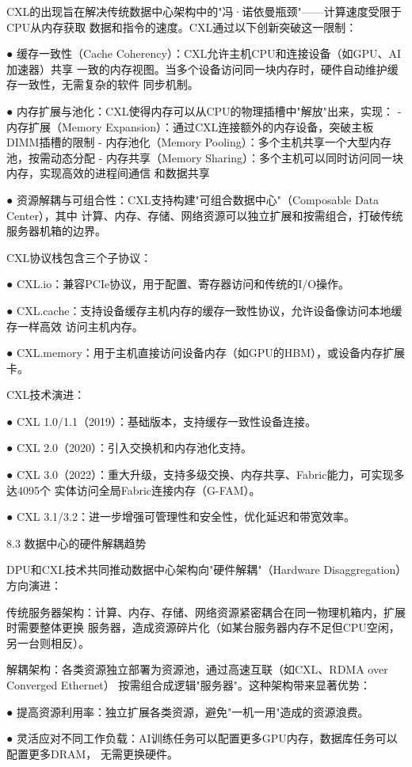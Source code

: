 CXL的出现旨在解决传统数据中心架构中的"冯·诺依曼瓶颈"——计算速度受限于CPU从内存获取
数据和指令的速度。CXL通过以下创新突破这一限制：

● 缓存一致性（Cache Coherency）：CXL允许主机CPU和连接设备（如GPU、AI加速器）共享
  一致的内存视图。当多个设备访问同一块内存时，硬件自动维护缓存一致性，无需复杂的软件
  同步机制。
  
● 内存扩展与池化：CXL使得内存可以从CPU的物理插槽中"解放"出来，实现：
  - 内存扩展（Memory Expansion）：通过CXL连接额外的内存设备，突破主板DIMM插槽的限制
  - 内存池化（Memory Pooling）：多个主机共享一个大型内存池，按需动态分配
  - 内存共享（Memory Sharing）：多个主机可以同时访问同一块内存，实现高效的进程间通信
    和数据共享

● 资源解耦与可组合性：CXL支持构建"可组合数据中心"（Composable Data Center），其中
  计算、内存、存储、网络资源可以独立扩展和按需组合，打破传统服务器机箱的边界。

CXL协议栈包含三个子协议：

● CXL.io：兼容PCIe协议，用于配置、寄存器访问和传统的I/O操作。
  
● CXL.cache：支持设备缓存主机内存的缓存一致性协议，允许设备像访问本地缓存一样高效
  访问主机内存。
  
● CXL.memory：用于主机直接访问设备内存（如GPU的HBM），或设备内存扩展卡。

CXL技术演进：

● CXL 1.0/1.1（2019）：基础版本，支持缓存一致性设备连接。
  
● CXL 2.0（2020）：引入交换机和内存池化支持。
  
● CXL 3.0（2022）：重大升级，支持多级交换、内存共享、Fabric能力，可实现多达4095个
  实体访问全局Fabric连接内存（G-FAM）。
  
● CXL 3.1/3.2：进一步增强可管理性和安全性，优化延迟和带宽效率。

8.3  数据中心的硬件解耦趋势

DPU和CXL技术共同推动数据中心架构向"硬件解耦"（Hardware Disaggregation）方向演进：

传统服务器架构：计算、内存、存储、网络资源紧密耦合在同一物理机箱内，扩展时需要整体更换
服务器，造成资源碎片化（如某台服务器内存不足但CPU空闲，另一台则相反）。

解耦架构：各类资源独立部署为资源池，通过高速互联（如CXL、RDMA over Converged Ethernet）
按需组合成逻辑"服务器"。这种架构带来显著优势：

● 提高资源利用率：独立扩展各类资源，避免"一机一用"造成的资源浪费。
  
● 灵活应对不同工作负载：AI训练任务可以配置更多GPU内存，数据库任务可以配置更多DRAM，
  无需更换硬件。
  
